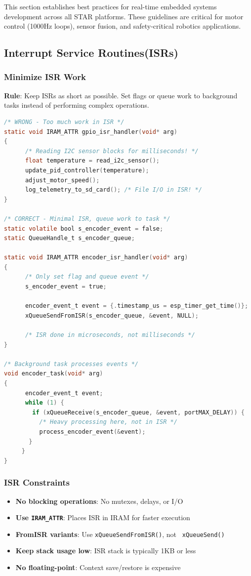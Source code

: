 This section establishes best practices for real-time embedded systems development across all STAR platforms. These guidelines are critical for motor control (1000Hz loops), sensor fusion, and safety-critical robotics applications.

\subsection{Interrupt Service Routines(ISRs)}

\subsubsection{Minimize ISR Work}

\textbf{Rule}: Keep ISRs as short as possible. Set flags or queue work to background tasks instead of performing complex operations.

\begin{lstlisting}[language=C]
/* WRONG - Too much work in ISR */
static void IRAM_ATTR gpio_isr_handler(void* arg)
{
      /* Reading I2C sensor blocks for milliseconds! */
      float temperature = read_i2c_sensor();
      update_pid_controller(temperature);
      adjust_motor_speed();
      log_telemetry_to_sd_card(); /* File I/O in ISR! */
}

/* CORRECT - Minimal ISR, queue work to task */
static volatile bool s_encoder_event = false;
static QueueHandle_t s_encoder_queue;

static void IRAM_ATTR encoder_isr_handler(void* arg)
{
      /* Only set flag and queue event */
      s_encoder_event = true;

      encoder_event_t event = {.timestamp_us = esp_timer_get_time()};
      xQueueSendFromISR(s_encoder_queue, &event, NULL);

      /* ISR done in microseconds, not milliseconds */
}

/* Background task processes events */
void encoder_task(void* arg)
{
      encoder_event_t event;
      while (1) {
        if (xQueueReceive(s_encoder_queue, &event, portMAX_DELAY)) {
          /* Heavy processing here, not in ISR */
          process_encoder_event(&event);
       }
     }
}


\end{lstlisting}
\subsubsection{ISR Constraints}

\begin{itemize}
\item \textbf{No blocking operations}: No mutexes, delays, or I/O
\item \textbf{Use \texttt{IRAM\_ATTR}}: Places ISR in IRAM for faster execution
\item \textbf{FromISR variants}: Use \texttt{xQueueSendFromISR()}, not \texttt{
      xQueueSend()}
\item \textbf{Keep stack usage low}: ISR stack is typically 1KB or less
\item \textbf{No floating-point}: Context save/restore is expensive
\end{itemize}


